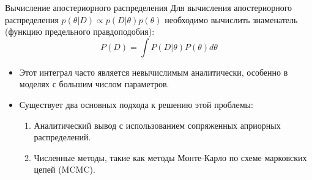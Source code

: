 \documentclass[notheorems, handout]{beamer}
\begin{document}
\begin{frame}{Вычисление апостериорного распределения}
    Для вычисления апостериорного распределения $p(\theta|D) \propto p(D|\theta)p(\theta)$ необходимо вычислить знаменатель (функцию предельного правдоподобия):
    \begin{equation*}
        P(D) = \int P(D | \theta) P(\theta) d\theta
    \end{equation*}
    \begin{itemize}
        \item Этот интеграл часто является невычислимым аналитически, особенно в моделях с большим числом параметров.
        \item Существует два основных подхода к решению этой проблемы:
        \begin{enumerate}
            \item Аналитический вывод с использованием сопряженных априорных распределений.
            \item Численные методы, такие как методы Монте-Карло по схеме марковских цепей (MCMC).
        \end{enumerate}
    \end{itemize}
\end{frame}
\end{document}
